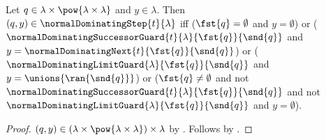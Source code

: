 \begin{proposition}\label{normal_dominating_step_iff}
    Let $q\in\lambda\times\pow{\lambda\times\lambda}$ and
        $y\in\lambda$.
    Then $(q,y)\in\normalDominatingStep{t}{\lambda}$ iff
        ($\fst{q}=\emptyset$ and $y=\emptyset$) or
        ($\normalDominatingSuccessorGuard{t}{\lambda}
            {\fst{q}}{\snd{q}}$ and
            $y=\normalDominatingNext{t}{\fst{q}}{\snd{q}}$) or
        ($\normalDominatingLimitGuard{\lambda}{\fst{q}}{\snd{q}}$ and
            $y=\unions{\ran{\snd{q}}}$) or
        ($\fst{q}\neq\emptyset$ and
            not $\normalDominatingSuccessorGuard{t}{\lambda}
                {\fst{q}}{\snd{q}}$ and
            not $\normalDominatingLimitGuard{\lambda}
                {\fst{q}}{\snd{q}}$ and
            $y=\emptyset$).
\end{proposition}
\begin{proof}
    $(q,y)\in
        (\lambda\times\pow{\lambda\times\lambda})\times\lambda$ by
        .
    Follows by .
\end{proof}

